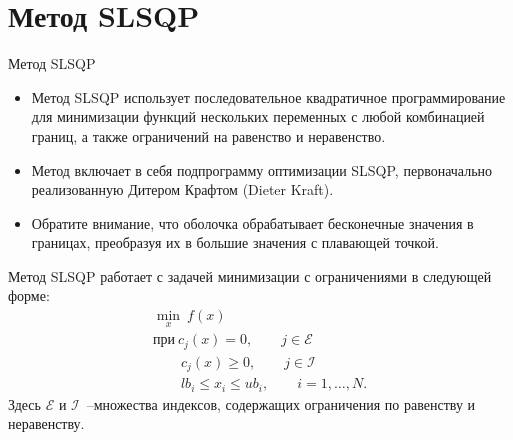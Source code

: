 \documentclass[aspectratio=169, mathserif]{beamer}%
\begin{document}
\section{Метод SLSQP}
\begin{frame}[fragile, label=c]{Метод SLSQP}
\scriptsize
\begin{itemize}
\item Метод SLSQP использует последовательное квадратичное программирование для минимизации функций нескольких переменных с любой комбинацией границ, а также ограничений на равенство и неравенство.
\item Метод включает в себя подпрограмму оптимизации SLSQP, первоначально реализованную Дитером Крафтом (Dieter Kraft).
\item Обратите внимание, что оболочка обрабатывает бесконечные значения в границах, преобразуя их в большие значения с плавающей точкой.
\end{itemize}
\vfill
Метод SLSQP работает с задачей минимизации с ограничениями в следующей форме:
\vfill
\begin{equation}\label{eq:problem}
\begin{gathered}
\underset{x}{\min}\ f\left(x\right) \\
\mathrm{при }\ c_j\left(x\right) = 0, \qquad j \in \mathcal{E} \\
\qquad c_j\left(x\right) \geqslant 0, \qquad j \in \mathcal{I} \\
\qquad lb_i \leqslant x_i \leqslant ub_i, \qquad i = 1, \ldots , N.
\end{gathered}
\end{equation}
\vfill
Здесь $\mathcal{E}$ и $\mathcal{I}$~--множества индексов, содержащих ограничения по равенству и неравенству.
\vfill
\end{frame}
\end{document}
